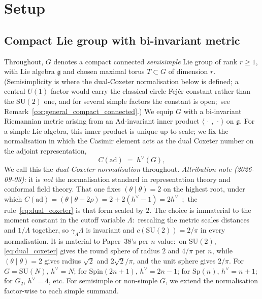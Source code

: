 \documentclass[11pt,a4paper]{article}
\theoremstyle{plain}
\theoremstyle{definition}
\newcommand{\Lammax}{\Lambda}
\newcommand{\SU}{\mathrm{SU}}
\newcommand{\Spin}{\mathrm{Spin}}
\newcommand{\Sp}{\mathrm{Sp}}
\newcommand{\Cas}{C}
\begin{document}
\section{Setup}\label{sec:setup}

\subsection{Compact Lie group with bi-invariant metric}
\label{sec:compact_lie}

Throughout, $G$ denotes a compact connected \emph{semisimple} Lie group
of rank $r \ge 1$, with Lie algebra $\mathfrak g$ and chosen maximal
torus $T \subset G$ of dimension $r$.  (Semisimplicity is where the
dual-Coxeter normalisation below is defined; a central $U(1)$ factor
would carry the classical circle Fej\'er constant rather than the
$\SU(2)$ one, and for
several simple factors the constant is open;\ see
Remark~\ref{cor:general_compact_connected}.) We equip $G$ with a bi-invariant Riemannian metric
arising from an $\mathrm{Ad}$-invariant inner product
$\langle\,\cdot\,,\,\cdot\,\rangle$ on $\mathfrak g$. For a simple Lie
algebra, this inner product is unique up to scale; we fix the
normalisation in which the Casimir element acts as the dual Coxeter
number on the adjoint representation,
\begin{equation}\label{eq:dual_coxeter}
   \Cas(\mathrm{ad}) \;=\; h^\vee(G),
\end{equation}
We call this the \emph{dual-Coxeter normalisation} throughout.
\emph{Attribution note (2026-09-03):} it is \emph{not} the normalisation
standard in representation theory and conformal field theory.  That one fixes
$(\theta \mid \theta) = 2$ on the highest root, under which
$\Cas(\mathrm{ad}) = (\theta \mid \theta + 2\rho) = 2 + 2(h^\vee - 1) =
2h^\vee$~\cite{kac1990};\ the rule~\eqref{eq:dual_coxeter} is that form scaled
by $2$.  The choice is immaterial to the moment constant in the cutoff
variable $\Lammax$:\ rescaling the metric scales distances and
$1/\Lammax$ together, so $\gamma_\Lammax \Lammax$ is invariant and
$c(\SU(2)) = 2/\pi$ in every normalisation. It is material to Paper~38's
per-$n$ value:\ on $\SU(2)$, \eqref{eq:dual_coxeter} gives the round
sphere of radius $2$ and $4/\pi$ per $n$, while $(\theta\mid\theta) = 2$
gives radius $\sqrt2$ and $2\sqrt2/\pi$, and the unit sphere gives
$2/\pi$. For
$G = \SU(N)$, $h^\vee = N$; for $\Spin(2n+1)$, $h^\vee = 2n - 1$; for
$\Sp(n)$, $h^\vee = n + 1$; for $G_2$, $h^\vee = 4$, etc. For
semisimple or non-simple $G$, we extend the normalisation factor-wise
to each simple summand.
\end{document}
